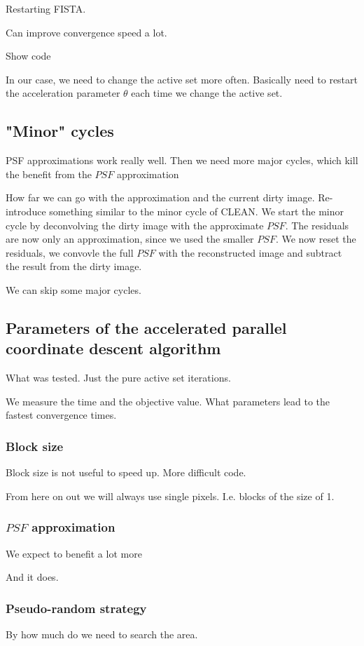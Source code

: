 Restarting FISTA.

Can improve convergence speed a lot.

Show code

In our case, we need to change the active set more often. Basically need to restart the acceleration parameter $\theta$ each time we change the active set.


\subsection{"Minor" cycles}
PSF approximations work really well.
Then we need more major cycles, which kill the benefit from the $PSF$ approximation

How far we can go with the approximation and the current dirty image.
Re-introduce something similar to the minor cycle of CLEAN. We start the minor cycle by deconvolving the dirty image with the approximate $PSF$. The residuals are now only an approximation, since we used the smaller $PSF$. We now reset the residuals, we convovle the full $PSF$ with the reconstructed image and subtract the result from the dirty image.

We can skip some major cycles.


\subsection{Parameters of the accelerated parallel coordinate descent algorithm}
What was tested.
Just the pure active set iterations.

We measure the time and the objective value. What parameters lead to the fastest convergence times.

\subsubsection{Block size}
Block size is not useful to speed up. More difficult code.

From here on out we will always use single pixels. I.e. blocks of the size of 1.

\subsubsection{$PSF$ approximation}
We expect to benefit a lot more
 
And it does. 

\subsubsection{Pseudo-random strategy}
By how much do we need to search the area.

